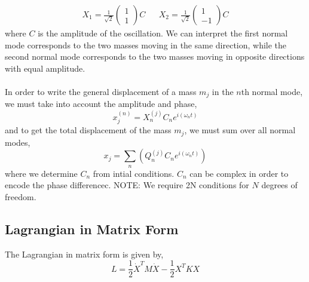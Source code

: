 \documentclass{book}
\begin{document}
\begin{align}
	X_1 = \frac{1}{\sqrt{2}}\begin{pmatrix}
		1 \\ 1
	\end{pmatrix}C && X_2 = \frac{1}{\sqrt{2}}\begin{pmatrix}
	1 \\ -1
	\end{pmatrix}C
\end{align}
where $C$ is the amplitude of the oscillation. We can interpret the first normal mode corresponds to the two masses moving in the same direction, while the second normal mode corresponds to the two masses moving in opposite directions with equal amplitude.
\\\\
In order to write the general displacement of a mass $m_j$ in the $n$th normal mode, we must take into account the amplitude and phase,
\begin{equation}
	x_j^{(n)} = X_n^{(j)}C_ne^{i(\omega_n t)}
\end{equation}
and to get the total displacement of the mass $m_j$, we must sum over all normal modes,
\begin{equation}
	x_j = \sum_n\left(Q_n^{(j)} C_ne^{i(\omega_nt)}\right)
\end{equation}
where we determine $C_n$ from intial conditions. $C_n$ can be complex in order to encode the phase differencec. NOTE: We require 2N conditions for $N$ degrees of freedom.
\subsection{Lagrangian in Matrix Form}
The Lagrangian in matrix form is given by,
\begin{equation}
	\boxed{L = \frac{1}{2}\Dot{X}^TM\Dot{X} - \frac{1}{2}X^TKX}
\end{equation}
\end{document}

